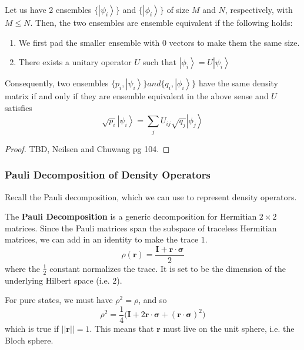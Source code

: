 \documentclass{article}
\newcommand{\ket}[1]{\ensuremath{\left|#1\right\rangle}}
\begin{document}
      \begin{theorem}
        Let us have 2 ensembles $\{\ket{\psi_i}\}$ and $\{\ket{\phi_i}\}$ of size $M$ and $N$, respectively, with $M \leq N$. Then, the two ensembles are ensemble equivalent if the following holds: 
        \begin{enumerate}
          \item We first pad the smaller ensemble with $0$ vectors to make them the same size. 
          \item There exists a unitary operator $U$ such that $\ket{\phi_i} = U \ket{\psi_i}$
        \end{enumerate}
        Consequently, two ensembles $\{p_i, \ket{\psi_i}\} and \{q_i, \ket{\phi_i}\}$ have the same density matrix if and only if they are ensemble equivalent in the above sense and $U$ satisfies 
        \begin{equation}
          \sqrt{p_i} \ket{\psi_i} = \sum_j U_{ij} \sqrt{q_j} \ket{\phi_j}
        \end{equation}
      \end{theorem}
      \begin{proof}
        TBD, Neilsen and Chuwang pg 104. 
      \end{proof}

    \subsubsection{Pauli Decomposition of Density Operators}

      Recall the Pauli decomposition, which we can use to represent density operators. 

      \begin{definition}
        The \textbf{Pauli Decomposition} is a generic decomposition for Hermitian $2 \times 2$ matrices. Since the Pauli matrices span the subspace of traceless Hermitian matrices, we can add in an identity to make the trace $1$. 
        \begin{equation}
          \rho(\mathbf{r}) = \frac{\mathbf{I} + \mathbf{r} \cdot \boldsymbol{\sigma}}{2}
        \end{equation}
        where the $\frac{1}{2}$ constant normalizes the trace. It is set to be the dimension of the underlying Hilbert space (i.e. $2$). 
      \end{definition}

      For pure states, we must have $\rho^2 = \rho$, and so 
      \begin{equation}
        \rho^2 = \frac{1}{4} \big( \mathbf{I} + 2 \mathbf{r} \cdot \boldsymbol{\sigma} + (\mathbf{r} \cdot \boldsymbol{\sigma})^2 \big)
      \end{equation}
      which is true if $||\mathbf{r}|| = 1$. This means that $\mathbf{r}$ must live on the unit sphere, i.e. the Bloch sphere. 
\end{document}
